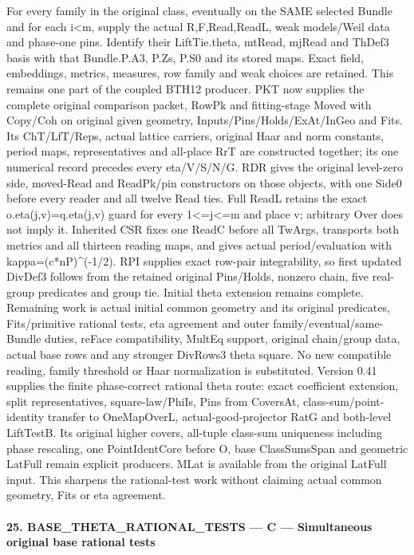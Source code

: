 For every family in the original class, eventually on the SAME selected Bundle and for each i<m, supply the actual R,F,Read,ReadL, weak models/Weil data and phase-one pins. Identify their LiftTie.theta, mtRead, mjRead and ThDef3 basis with that Bundle.P.A3, P.Zs, P.S0 and its stored maps. Exact field, embeddings, metrics, measures, row family and weak choices are retained. This remains one part of the coupled BTH12 producer. PKT now supplies the complete original comparison packet, RowPk and fitting-stage Moved with Copy/Coh on original given geometry, Inputs/Pins/Holds/ExAt/InGeo and Fits. Its ChT/LfT/Reps, actual lattice carriers, original Haar and norm constants, period maps, representatives and all-place RrT are constructed together; its one numerical record precedes every eta/V/S/N/G. RDR gives the original level-zero side, moved-Read and ReadPk/pin constructors on those objects, with one Side0 before every reader and all twelve Read ties. Full ReadL retains the exact o.eta(j,v)=q.eta(j,v) guard for every 1<=j<=m and place v; arbitrary Over does not imply it. Inherited CSR fixes one ReadC before all TwArgs, transports both metrics and all thirteen reading maps, and gives actual period/evaluation with kappa=(c*nP)\textasciicircum{}(-1/2). RPI supplies exact row-pair integrability, so first updated DivDef3 follows from the retained original Pins/Holds, nonzero chain, five real-group predicates and group tie. Initial theta extension remains complete. Remaining work is actual initial common geometry and its original predicates, Fits/primitive rational tests, eta agreement and outer family/eventual/same-Bundle duties, reFace compatibility, MultEq support, original chain/group data, actual base rows and any stronger DivRows3 theta square. No new compatible reading, family threshold or Haar normalization is substituted. Version 0.41 supplies the finite phase-correct rational theta route: exact coefficient extension, split representatives, square-law/PhiIs, Pins from CoversAt, class-sum/point-identity transfer to OneMapOverL, actual-good-projector RatG and both-level LiftTestB. Its original higher covers, all-tuple class-sum uniqueness including phase rescaling, one PointIdentCore before O, base ClassSumsSpan and geometric LatFull remain explicit producers. MLat is available from the original LatFull input. This sharpens the rational-test work without claiming actual common geometry, Fits or eta agreement.



\paragraph{25. BASE\_\allowbreak THETA\_\allowbreak RATIONAL\_\allowbreak TESTS — C — Simultaneous original base rational tests}

